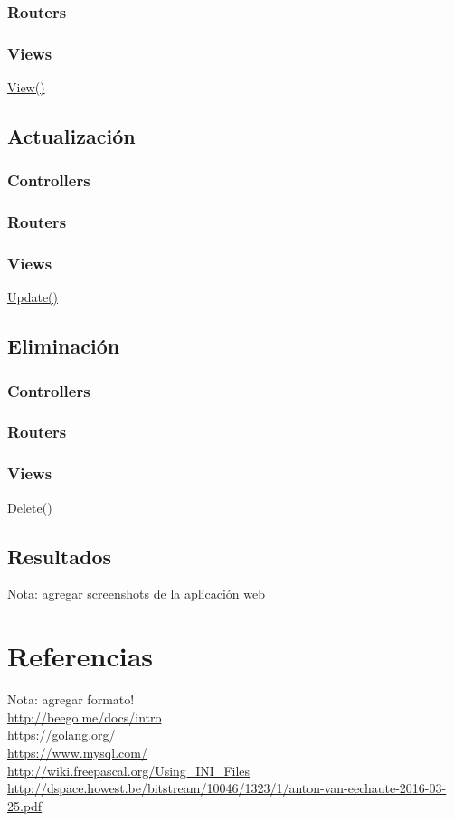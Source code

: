\documentclass[12pt]{article}
\begin{document}
\subsubsection{Routers}
\subsubsection{Views}
\href{https://github.com/Kihui/Beego-CRUD/blob/master/controllers/default.go\#L15}{View()}
\subsection{Actualización}
\subsubsection{Controllers}
\subsubsection{Routers}
\subsubsection{Views}
\href{https://github.com/Kihui/Beego-CRUD/blob/master/controllers/default.go\#L94}{Update()}
\subsection{Eliminación}
\subsubsection{Controllers}
\subsubsection{Routers}
\subsubsection{Views}
\href{https://github.com/Kihui/Beego-CRUD/blob/master/controllers/default.go\#L64}{Delete()}

\subsection{Resultados}
Nota: agregar screenshots de la aplicación web
\section{Referencias}
Nota: agregar formato!\\
\noindent
\url{http://beego.me/docs/intro} \\
\url{https://golang.org/}\\
\url{https://www.mysql.com/} \\
\url{http://wiki.freepascal.org/Using_INI_Files} \\
\url{http://dspace.howest.be/bitstream/10046/1323/1/anton-van-eechaute-2016-03-25.pdf}
\end{document}
